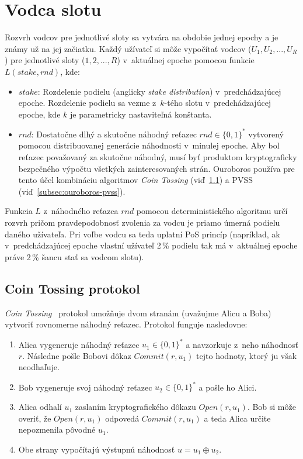 \section{Vodca slotu}\label{sec:ouroboros-slot-leader}

Rozvrh vodcov pre jednotlivé sloty sa vytvára na obdobie jednej epochy a je známy už na jej začiatku. Každý užívateľ si môže vypočítať vodcov ($U_1, U_2,  ..., U_R$) pre jednotlivé sloty ($1, 2, ..., R$) v~aktuálnej epoche pomocou funkcie $L(stake, rnd)$, kde:
\begin{itemize}
	\item $stake$: Rozdelenie podielu (anglicky \textit{stake distribution}) v~predchádzajúcej epoche. Rozdelenie podielu sa vezme z~$k$-tého slotu v~predchádzajúcej epoche, kde $k$ je parametricky nastaviteľná konštanta.
	\item $rnd$: Dostatočne dlhý a skutočne náhodný reťazec $rnd \in \{0,1\}^*$ vytvorený pomocou distribuovanej generácie náhodnosti v~minulej epoche. Aby bol reťazec považovaný za skutočne náhodný, musí byť produktom kryptograficky bezpečného výpočtu všetkých zainteresovaných strán. Ouroboros používa pre tento účel kombináciu algoritmov \textit{Coin Tossing} (viď~\ref{subsec:ouroboros-coin-tossing}) a PVSS (viď~\ref{subsec:ouroboros-pvss}).
\end{itemize}
Funkcia $L$ z~náhodného reťazca $rnd$ pomocou deterministického algoritmu určí rozvrh pričom pravdepodobnosť zvolenia za vodcu je priamo úmerná podielu daného užívateľa. Pri voľbe vodcu sa teda uplatní PoS princíp (napríklad, ak v~predchádzajúcej epoche vlastní užívateľ 2\,\% podielu tak má v~aktuálnej epoche práve 2\,\% šancu stať sa vodcom slotu).

\subsection{Coin Tossing protokol}\label{subsec:ouroboros-coin-tossing}

\textit{Coin Tossing}~\cite{coinFlipBlum} protokol umožňuje dvom stranám (uvažujme Alicu a Boba) vytvoriť rovnomerne náhodný reťazec. Protokol funguje nasledovne:
\begin{enumerate}
	\item Alica vygeneruje náhodný reťazec $u_1 \in \{0,1\}^*$ a navzorkuje z~neho náhodnosť $r$. Následne pošle Bobovi dôkaz $Commit(r,u_1)$ tejto hodnoty, ktorý ju však neodhaľuje.
	\item Bob vygeneruje svoj náhodný reťazec $u_2 \in \{0,1\}^*$ a pošle ho Alici. 
	\item Alica odhalí $u_1$ zaslaním kryptografického dôkazu $Open(r,u_1)$. Bob si môže overiť, že $Open(r,u_1)$ odpovedá $Commit(r,u_1)$ a teda Alica určite nepozmenila pôvodné $u_1$.
	\item Obe strany vypočítajú výstupnú náhodnosť $u = u_1 \oplus u_2$.
\end{enumerate}

